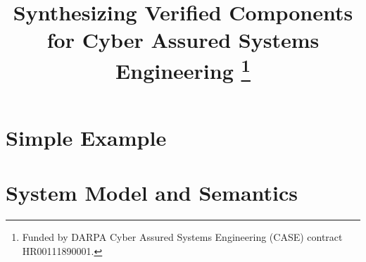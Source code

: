 \documentclass[conference]{IEEEtran}
\theoremstyle{plain}
\theoremstyle{definition}
\theoremstyle{remark}
\begin{document}
\title{
  Synthesizing Verified Components for Cyber Assured Systems Engineering 
  \thanks{
    Funded by DARPA Cyber Assured Systems Engineering (CASE) contract HR00111890001.
  }
}

\author{
\and
{}
}


\maketitle

\begin{abstract}

\end{abstract}

\IEEEpeerreviewmaketitle

% 

\section{Simple Example}


\section{System Model and Semantics}


%  

% 
\end{document}

